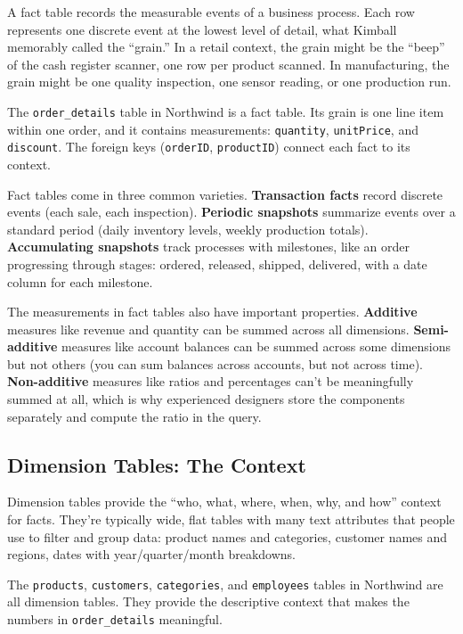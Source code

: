 \documentclass[
  letterpaper,
  DIV=11,
  numbers=noendperiod]{scrreprt}
\begin{document}
A fact table records the measurable events of a business process. Each
row represents one discrete event at the lowest level of detail, what
Kimball memorably called the ``grain.'' In a retail context, the grain
might be the ``beep'' of the cash register scanner, one row per product
scanned. In manufacturing, the grain might be one quality inspection,
one sensor reading, or one production run.

The \texttt{order\_details} table in Northwind is a fact table. Its
grain is one line item within one order, and it contains measurements:
\texttt{quantity}, \texttt{unitPrice}, and \texttt{discount}. The
foreign keys (\texttt{orderID}, \texttt{productID}) connect each fact to
its context.

Fact tables come in three common varieties. \textbf{Transaction facts}
record discrete events (each sale, each inspection). \textbf{Periodic
snapshots} summarize events over a standard period (daily inventory
levels, weekly production totals). \textbf{Accumulating snapshots} track
processes with milestones, like an order progressing through stages:
ordered, released, shipped, delivered, with a date column for each
milestone.

The measurements in fact tables also have important properties.
\textbf{Additive} measures like revenue and quantity can be summed
across all dimensions. \textbf{Semi-additive} measures like account
balances can be summed across some dimensions but not others (you can
sum balances across accounts, but not across time).
\textbf{Non-additive} measures like ratios and percentages can't be
meaningfully summed at all, which is why experienced designers store the
components separately and compute the ratio in the query.

\subsection{Dimension Tables: The
Context}\label{dimension-tables-the-context}

Dimension tables provide the ``who, what, where, when, why, and how''
context for facts. They're typically wide, flat tables with many text
attributes that people use to filter and group data: product names and
categories, customer names and regions, dates with year/quarter/month
breakdowns.

The \texttt{products}, \texttt{customers}, \texttt{categories}, and
\texttt{employees} tables in Northwind are all dimension tables. They
provide the descriptive context that makes the numbers in
\texttt{order\_details} meaningful.
\end{document}
